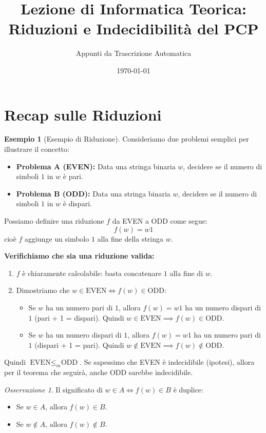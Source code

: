 \documentclass[a4paper]{article}
\title{Lezione di Informatica Teorica: Riduzioni e Indecidibilità del PCP}
\author{Appunti da Trascrizione Automatica}
\date{\today}
\theoremstyle{definition} %
\newtheorem{example}{Esempio}
\theoremstyle{remark} %
\newtheorem{remark}{Osservazione}
\begin{document}
\maketitle
\tableofcontents
\newpage

\section{Recap sulle Riduzioni}

\begin{example}[Esempio di Riduzione]
Consideriamo due problemi semplici per illustrare il concetto:
\begin{itemize}
    \item \textbf{Problema A (EVEN):} Data una stringa binaria $w$, decidere se il numero di simboli $1$ in $w$ è pari.
    \item \textbf{Problema B (ODD):} Data una stringa binaria $w$, decidere se il numero di simboli $1$ in $w$ è dispari.
\end{itemize}

Possiamo definire una riduzione $f$ da EVEN a ODD come segue:
$$f(w) = w1$$
cioè $f$ aggiunge un simbolo $1$ alla fine della stringa $w$.

\textbf{Verifichiamo che sia una riduzione valida:}
\begin{enumerate}
    \item $f$ è chiaramente calcolabile: basta concatenare $1$ alla fine di $w$.
    \item Dimostriamo che $w \in \text{EVEN} \iff f(w) \in \text{ODD}$:
    \begin{itemize}
        \item Se $w$ ha un numero pari di $1$, allora $f(w) = w1$ ha un numero dispari di $1$ (pari + 1 = dispari). Quindi $w \in \text{EVEN} \implies f(w) \in \text{ODD}$.
        \item Se $w$ ha un numero dispari di $1$, allora $f(w) = w1$ ha un numero pari di $1$ (dispari + 1 = pari). Quindi $w \notin \text{EVEN} \implies f(w) \notin \text{ODD}$.
    \end{itemize}
\end{enumerate}

Quindi $\text{EVEN} \le_m \text{ODD}$. Se sapessimo che EVEN è indecidibile (ipotesi), allora per il teorema che seguirà, anche ODD sarebbe indecidibile.
\end{example}

\begin{remark}
Il significato di $w \in A \iff f(w) \in B$ è duplice:
\begin{itemize}
    \item Se $w \in A$, allora $f(w) \in B$.
    \item Se $w \notin A$, allora $f(w) \notin B$.
\end{itemize}
\end{remark}
\end{document}
